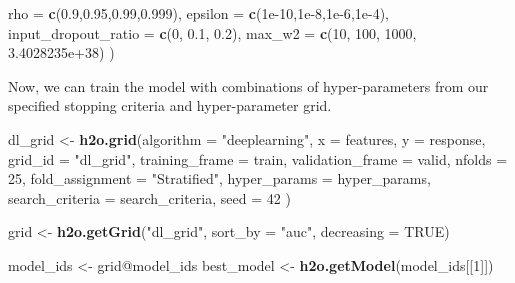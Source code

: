 \documentclass[]{article}
\newenvironment{Shaded}{\begin{snugshade}}{\end{snugshade}}
\newcommand{\KeywordTok}[1]{\textcolor[rgb]{0.13,0.29,0.53}{\textbf{{#1}}}}
\newcommand{\DataTypeTok}[1]{\textcolor[rgb]{0.13,0.29,0.53}{{#1}}}
\newcommand{\DecValTok}[1]{\textcolor[rgb]{0.00,0.00,0.81}{{#1}}}
\newcommand{\FloatTok}[1]{\textcolor[rgb]{0.00,0.00,0.81}{{#1}}}
\newcommand{\StringTok}[1]{\textcolor[rgb]{0.31,0.60,0.02}{{#1}}}
\newcommand{\OtherTok}[1]{\textcolor[rgb]{0.56,0.35,0.01}{{#1}}}
\newcommand{\NormalTok}[1]{{#1}}
\begin{document}
\begin{Shaded}
\begin{Highlighting}[]
                     \DataTypeTok{rho =} \KeywordTok{c}\NormalTok{(}\FloatTok{0.9}\NormalTok{,}\FloatTok{0.95}\NormalTok{,}\FloatTok{0.99}\NormalTok{,}\FloatTok{0.999}\NormalTok{),}
                     \DataTypeTok{epsilon =} \KeywordTok{c}\NormalTok{(}\FloatTok{1e-10}\NormalTok{,}\FloatTok{1e-8}\NormalTok{,}\FloatTok{1e-6}\NormalTok{,}\FloatTok{1e-4}\NormalTok{),}
                     \DataTypeTok{input_dropout_ratio =} \KeywordTok{c}\NormalTok{(}\DecValTok{0}\NormalTok{, }\FloatTok{0.1}\NormalTok{, }\FloatTok{0.2}\NormalTok{),}
                     \DataTypeTok{max_w2 =} \KeywordTok{c}\NormalTok{(}\DecValTok{10}\NormalTok{, }\DecValTok{100}\NormalTok{, }\DecValTok{1000}\NormalTok{, }\FloatTok{3.4028235e+38}\NormalTok{)}
                     \NormalTok{)}
\end{Highlighting}
\end{Shaded}

Now, we can train the model with combinations of hyper-parameters from
our specified stopping criteria and hyper-parameter grid.

\begin{Shaded}
\begin{Highlighting}[]
\NormalTok{dl_grid <-}\StringTok{ }\KeywordTok{h2o.grid}\NormalTok{(}\DataTypeTok{algorithm =} \StringTok{"deeplearning"}\NormalTok{, }
                    \DataTypeTok{x =} \NormalTok{features,}
                    \DataTypeTok{y =} \NormalTok{response,}
                    \DataTypeTok{grid_id =} \StringTok{"dl_grid"}\NormalTok{,}
                    \DataTypeTok{training_frame =} \NormalTok{train,}
                    \DataTypeTok{validation_frame =} \NormalTok{valid,}
                    \DataTypeTok{nfolds =} \DecValTok{25}\NormalTok{,                           }
                    \DataTypeTok{fold_assignment =} \StringTok{"Stratified"}\NormalTok{,}
                    \DataTypeTok{hyper_params =} \NormalTok{hyper_params,}
                    \DataTypeTok{search_criteria =} \NormalTok{search_criteria,}
                    \DataTypeTok{seed =} \DecValTok{42}
                    \NormalTok{)}
\end{Highlighting}
\end{Shaded}

\begin{Shaded}
\begin{Highlighting}[]
\NormalTok{grid <-}\StringTok{ }\KeywordTok{h2o.getGrid}\NormalTok{(}\StringTok{"dl_grid"}\NormalTok{, }\DataTypeTok{sort_by =} \StringTok{"auc"}\NormalTok{, }\DataTypeTok{decreasing =} \OtherTok{TRUE}\NormalTok{)}
  
\NormalTok{model_ids <-}\StringTok{ }\NormalTok{grid@model_ids}
\NormalTok{best_model <-}\StringTok{ }\KeywordTok{h2o.getModel}\NormalTok{(model_ids[[}\DecValTok{1}\NormalTok{]])}
\end{Highlighting}
\end{Shaded}
\end{document}
